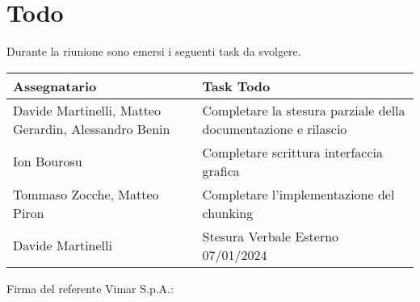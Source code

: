 \section{Todo}
Durante la riunione sono emersi i seguenti task da svolgere.

\begin{center}
  \begin{tabular}{|p{5cm}|p{8cm}|}
    \hline
    \textbf{Assegnatario}       & \textbf{Task Todo} \\ \hline
        Davide Martinelli, Matteo Gerardin, Alessandro Benin & Completare la stesura parziale della documentazione e rilascio   \\ \hline
        Ion Bourosu & Completare scrittura interfaccia grafica \\ \hline
        Tommaso Zocche, Matteo Piron & Completare l'implementazione del chunking \\ \hline
        Davide Martinelli & Stesura Verbale Esterno 07/01/2024 \\ \hline
  \end{tabular}
\end{center}

\vspace{4cm}
\noindent Firma del referente Vimar S.p.A.: \underline{\hspace{5cm}}